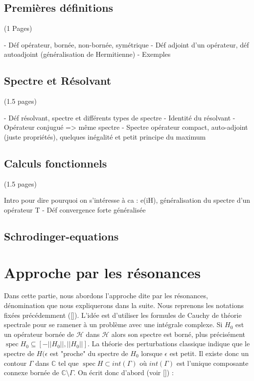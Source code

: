 \documentclass[12pt,openany,a4paper, titlepage]{article}
\newcommand{\lc}{\left[}
\newcommand{\rcc}{\right]}
\newcommand{\C}{\mathbb{C}}
\newcommand{\spec}{\operatorname{spec}}
\theoremstyle{definition}
\theoremstyle{definition}
\theoremstyle{definition}
\theoremstyle{definition}
\theoremstyle{definition}
\theoremstyle{definition}
\begin{document}
\subsection{Premières définitions} (1 Pages)

- Déf opérateur, bornée, non-bornée, symétrique
- Déf adjoint d'un opérateur, déf autoadjoint (généralisation de Hermitienne)
- Exemples

\subsection{Spectre et Résolvant} (1.5 pages)

- Déf résolvant, spectre et différents types de spectre
- Identité du résolvant
- Opérateur conjugué => même spectre
- Spectre opérateur compact, auto-adjoint (juste propriétés), quelques inégalité et petit principe du maximum


\subsection{Calculs fonctionnels} (1.5 pages)

Intro pour dire pourquoi on s'intéresse à ca : e(iH), généralisation du spectre d'un opérateur T
- Déf convergence forte généralisée

\subsection{Schrodinger-equations}



\newpage
\section{Approche par les résonances}

Dans cette partie, nous abordons l'approche dite par les résonances, dénomination que nous expliquerons dans la suite. Nous reprenons les notations fixées précédemment ([]). L'idée est d'utiliser les formules de Cauchy de théorie spectrale pour se ramener à un problème avec une intégrale complexe. Si $H_0$ est un opérateur bornée de $\mathcal{H}$ dans $\mathcal{H}$ alors son spectre est borné, plus précisément $\spec H_0 \subseteq \lc-||H_0||, ||H_0||\rcc$. La théorie des perturbations classique indique que le spectre de $H(\epsilon$ est "proche" du spectre de $H_0$ lorsque $\epsilon$ est petit. Il existe donc un contour $\Gamma$ dans $\C$ tel que $\spec H \subset int(\Gamma)$ où $int(\Gamma)$ est l'unique composante connexe bornée  de $\C\setminus \Gamma$. On écrit donc d'abord (voir []) :
\end{document}
